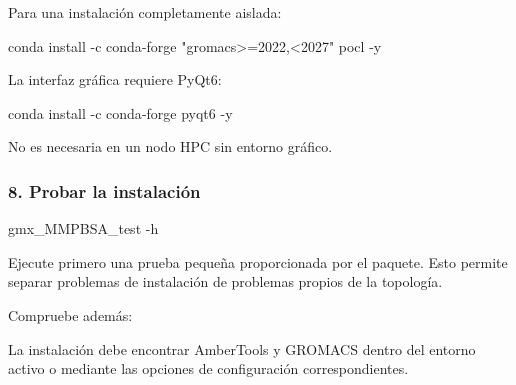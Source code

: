 \documentclass[
  spanish,
  11pt,
  a4paper]{article}
\newenvironment{Shaded}{\begin{snugshade}}{\end{snugshade}}
\newcommand{\AttributeTok}[1]{\textcolor[rgb]{0.13,0.29,0.53}{#1}}
\newcommand{\BuiltInTok}[1]{#1}
\newcommand{\ExtensionTok}[1]{#1}
\newcommand{\NormalTok}[1]{#1}
\newcommand{\OperatorTok}[1]{\textcolor[rgb]{0.81,0.36,0.00}{\textbf{#1}}}
\newcommand{\StringTok}[1]{\textcolor[rgb]{0.31,0.60,0.02}{#1}}
\newcommand{\VariableTok}[1]{\textcolor[rgb]{0.00,0.00,0.00}{#1}}
\begin{document}
Para una instalación completamente aislada:

\begin{Shaded}
\begin{Highlighting}[]
\ExtensionTok{conda}\NormalTok{ install }\AttributeTok{{-}c}\NormalTok{ conda{-}forge }\StringTok{"gromacs\textgreater{}=2022,\textless{}2027"}\NormalTok{ pocl }\AttributeTok{{-}y}
\end{Highlighting}
\end{Shaded}

La interfaz gráfica requiere PyQt6:

\begin{Shaded}
\begin{Highlighting}[]
\ExtensionTok{conda}\NormalTok{ install }\AttributeTok{{-}c}\NormalTok{ conda{-}forge pyqt6 }\AttributeTok{{-}y}
\end{Highlighting}
\end{Shaded}

No es necesaria en un nodo HPC sin entorno gráfico.

\subsubsection{8. Probar la instalación}\label{probar-la-instalaciuxf3n}

\begin{Shaded}
\begin{Highlighting}[]
\ExtensionTok{gmx\_MMPBSA\_test} \AttributeTok{{-}h}
\end{Highlighting}
\end{Shaded}

Ejecute primero una prueba pequeña proporcionada por el paquete. Esto
permite separar problemas de instalación de problemas propios de la
topología.

Compruebe además:

\begin{Shaded}
\end{Shaded}

La instalación debe encontrar AmberTools y GROMACS dentro del entorno
activo o mediante las opciones de configuración correspondientes.
\end{document}
